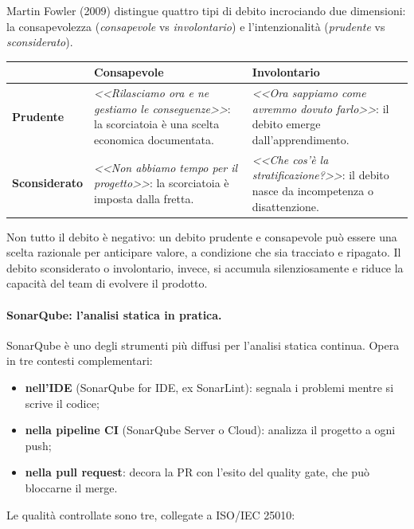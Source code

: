 \documentclass[12pt]{extarticle}
\begin{document}
\noindent Martin Fowler (2009) distingue quattro tipi di debito incrociando due dimensioni: la consapevolezza (\textit{consapevole} vs \textit{involontario}) e l'intenzionalità (\textit{prudente} vs \textit{sconsiderato}).

\begin{center}
\small
\setlength{\tabcolsep}{5pt}
\begin{tabular}{p{2.4cm}p{6.6cm}p{6.6cm}}
    \toprule
    & \textbf{Consapevole} & \textbf{Involontario} \\
    \midrule
    \textbf{Prudente} & \textit{<<Rilasciamo ora e ne gestiamo le conseguenze>>}: la scorciatoia è una scelta economica documentata. & \textit{<<Ora sappiamo come avremmo dovuto farlo>>}: il debito emerge dall'apprendimento. \\
    \addlinespace
    \textbf{Sconsiderato} & \textit{<<Non abbiamo tempo per il progetto>>}: la scorciatoia è imposta dalla fretta. & \textit{<<Che cos'è la stratificazione?>>}: il debito nasce da incompetenza o disattenzione. \\
    \bottomrule
\end{tabular}
\end{center}

\noindent Non tutto il debito è negativo: un debito prudente e consapevole può essere una scelta razionale per anticipare valore, a condizione che sia tracciato e ripagato. Il debito sconsiderato o involontario, invece, si accumula silenziosamente e riduce la capacità del team di evolvere il prodotto.

\paragraph{SonarQube: l'analisi statica in pratica.}
SonarQube è uno degli strumenti più diffusi per l'analisi statica continua. Opera in tre contesti complementari:

\begin{itemize}
    \item \textbf{nell'IDE} (SonarQube for IDE, ex SonarLint): segnala i problemi mentre si scrive il codice;
    \item \textbf{nella pipeline CI} (SonarQube Server o Cloud): analizza il progetto a ogni push;
    \item \textbf{nella pull request}: decora la PR con l'esito del quality gate, che può bloccarne il merge.
\end{itemize}

\noindent Le qualità controllate sono tre, collegate a ISO/IEC 25010:
\end{document}

